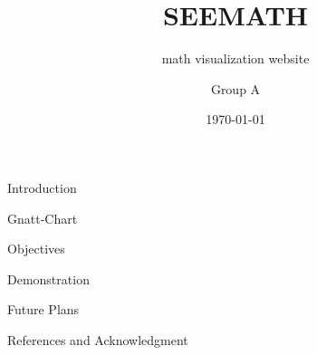 \documentclass[12pt]{beamer}
\begin{document}
	\author{Group A}
	\title{SEEMATH}
	\subtitle{math visualization website}
	\date{\today}
	
	\begin{frame}[plain]
		\maketitle
	\end{frame}
	
	\begin{frame}{Introduction}

		
	\end{frame}
	
	\begin{frame}{Gnatt-Chart}

		
	\end{frame}
	
	\begin{frame}{Objectives}

	\end{frame}
	
	\begin{frame}{Demonstration}

	\end{frame}
	
	\begin{frame}{Future Plans}

	\end{frame}

	\begin{frame}{References and Acknowledgment}
		
\end{frame}
	
\end{document}
